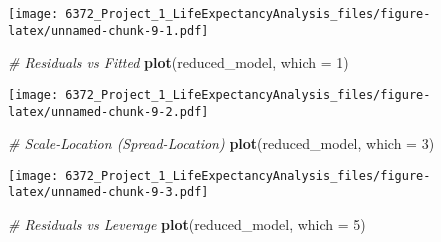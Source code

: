 \documentclass[
]{article}
\newenvironment{Shaded}{\begin{snugshade}}{\end{snugshade}}
\newcommand{\AttributeTok}[1]{\textcolor[rgb]{0.13,0.29,0.53}{#1}}
\newcommand{\CommentTok}[1]{\textcolor[rgb]{0.56,0.35,0.01}{\textit{#1}}}
\newcommand{\DecValTok}[1]{\textcolor[rgb]{0.00,0.00,0.81}{#1}}
\newcommand{\FunctionTok}[1]{\textcolor[rgb]{0.13,0.29,0.53}{\textbf{#1}}}
\newcommand{\NormalTok}[1]{#1}
\newcommand{\OtherTok}[1]{\textcolor[rgb]{0.56,0.35,0.01}{#1}}
\newcommand{\SpecialCharTok}[1]{\textcolor[rgb]{0.81,0.36,0.00}{\textbf{#1}}}
\begin{document}
\begin{Shaded}
\end{Shaded}

\texttt{[image: 6372\_Project\_1\_LifeExpectancyAnalysis\_files/figure-latex/unnamed-chunk-9-1.pdf]}

\begin{Shaded}
\begin{Highlighting}[]
\CommentTok{\# Residuals vs Fitted}
\FunctionTok{plot}\NormalTok{(reduced\_model, }\AttributeTok{which =} \DecValTok{1}\NormalTok{)}
\end{Highlighting}
\end{Shaded}

\texttt{[image: 6372\_Project\_1\_LifeExpectancyAnalysis\_files/figure-latex/unnamed-chunk-9-2.pdf]}

\begin{Shaded}
\begin{Highlighting}[]
\CommentTok{\# Scale{-}Location (Spread{-}Location)}
\FunctionTok{plot}\NormalTok{(reduced\_model, }\AttributeTok{which =} \DecValTok{3}\NormalTok{)}
\end{Highlighting}
\end{Shaded}

\texttt{[image: 6372\_Project\_1\_LifeExpectancyAnalysis\_files/figure-latex/unnamed-chunk-9-3.pdf]}

\begin{Shaded}
\begin{Highlighting}[]
\CommentTok{\# Residuals vs Leverage}
\FunctionTok{plot}\NormalTok{(reduced\_model, }\AttributeTok{which =} \DecValTok{5}\NormalTok{)}
\end{Highlighting}
\end{Shaded}
\end{document}
